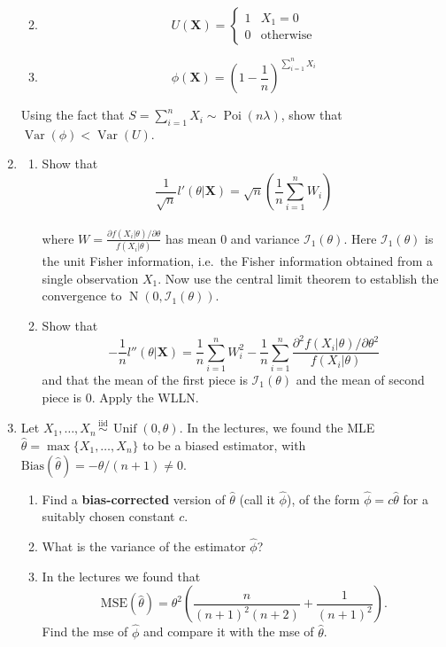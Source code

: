 \documentclass[
]{book}
\newcommand{\bX}{{\boldsymbol X}}
\DeclareMathOperator{\Var}{Var}
\DeclareMathOperator{\N}{N}
\DeclareMathOperator{\Pois}{Poi}
\DeclareMathOperator{\Unif}{Unif}
\newcommand{\iid}{\,\overset{\text{iid}}{\sim}\,}
\newcommand{\cI}{{\mathcal I}}
\theoremstyle{definition}
\theoremstyle{definition}
\theoremstyle{definition}
\theoremstyle{definition}
\theoremstyle{remark}
\begin{document}
\begin{enumerate}
  \begin{enumerate}
  \def\labelenumii{\alph{enumii}.}
  \item
    \[
     U(\bX) = \begin{cases}
         1 &X_1=0 \\
         0 & \text{otherwise}
     \end{cases}
     \]
  \item
    \[\phi(\bX)=\left(1-\frac{1}{n} \right)^{\sum_{i=1}^n X_i}\]
  \end{enumerate}

  Using the fact that \(S=\sum_{i=1}^n X_i\sim\Pois(n\lambda)\), show that \(\Var(\phi)<\Var(U)\).
\item
  \begin{enumerate}
  \def\labelenumii{(\alph{enumii})}
  \item
    Show that
    \[
    \frac{1}{\sqrt n} l'(\theta|\bX) = \sqrt n\left(\frac{1}{n} \sum_{i=1}^n W_i \right)
    \]\\
    where \(W=\frac{\partial f(X_i|\theta)/\partial\theta }{f(X_i|\theta)}\) has mean 0 and variance \(\cI_1(\theta)\). Here \(\cI_1(\theta)\) is the unit Fisher information, i.e.~the Fisher information obtained from a single observation \(X_1\). Now use the central limit theorem to establish the convergence to \(\N(0,\cI_1(\theta))\).
  \item
    Show that
    \[
      -\frac{1}{n} l''(\theta|\bX) = \frac{1}{n} \sum_{i=1}^n W_i^2 - \frac{1}{n} \sum_{i=1}^n\frac{\partial^2 f(X_i|\theta)/\partial\theta^2 }{f(X_i|\theta)}
      \]
    and that the mean of the first piece is \(\cI_1(\theta)\) and the mean of second piece is 0. Apply the WLLN.
  \end{enumerate}
\item
  Let \(X_1,\dots,X_n\iid\Unif(0,\theta)\). In the lectures, we found the MLE \(\hat\theta=\max\{X_1,\dots,X_n\}\) to be a biased estimator, with \(\text{Bias}(\hat\theta)=-\theta/(n+1)\neq 0\).

  \begin{enumerate}
  \def\labelenumii{(\alph{enumii})}
  \item
    Find a \textbf{bias-corrected} version of \(\hat\theta\) (call it \(\hat\phi\)), of the form \(\hat\phi=c\hat\theta\) for a suitably chosen constant \(c\).
  \item
    What is the variance of the estimator \(\hat\phi\)?
  \item
    In the lectures we found that
    \[
      \text{MSE}(\hat\theta)=\theta^2\left(\frac{n}{(n+1)^2(n+2)} + \frac{1}{(n+1)^2} \right).
      \]
    Find the mse of \(\hat\phi\) and compare it with the mse of \(\hat\theta\).
  \end{enumerate}
\end{enumerate}
\end{document}
